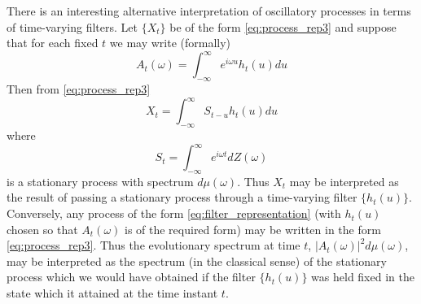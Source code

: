 \documentclass{article}
\begin{document}
There is an interesting alternative interpretation of oscillatory processes in
terms of time-varying filters. Let $\{X_t \}$ be of the form
\eqref{eq:process_rep3} and suppose that for each fixed $t$ we may write
(formally)
\begin{equation}
  \label{eq:filter_fourier} A_t (\omega) = \int_{- \infty}^{\infty} e^{i
  \omega u} h_t (u) du
\end{equation}
Then from \eqref{eq:process_rep3}
\begin{equation}
  \label{eq:filter_representation} X_t = \int_{- \infty}^{\infty} S_{t - u}
  h_t (u) du
\end{equation}
where
\begin{equation}
  \label{eq:stationary_process} S_t = \int_{- \infty}^{\infty} e^{i \omega t}
  dZ (\omega)
\end{equation}
is a stationary process with spectrum $d \mu (\omega)$. Thus $X_t$ may be
interpreted as the result of passing a stationary process through a
time-varying filter $\{h_t (u)\}$. Conversely, any process of the form
\eqref{eq:filter_representation} (with $h_t (u)$ chosen so that $A_t (\omega)$
is of the required form) may be written in the form \eqref{eq:process_rep3}.
Thus the evolutionary spectrum at time $t$, $|A_t (\omega) |^2 d \mu
(\omega)$, may be interpreted as the spectrum (in the classical sense) of the
stationary process which we would have obtained if the filter $\{h_t (u)\}$
was held fixed in the state which it attained at the time instant $t$.

\
\end{document}

